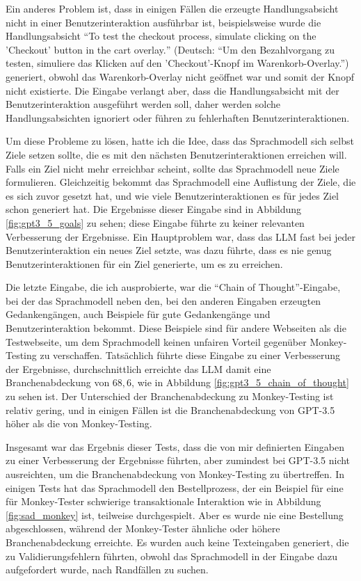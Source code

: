 Ein anderes Problem ist, dass in einigen Fällen die erzeugte Handlungsabsicht nicht in einer Benutzerinteraktion ausführbar ist, beispielsweise wurde die Handlungsabsicht \enquote{\foreignlanguage{english}{To test the checkout process, simulate clicking on the 'Checkout' button in the cart overlay.}} (Deutsch: \enquote{Um den Bezahlvorgang zu testen, simuliere das Klicken auf den 'Checkout'-Knopf im Warenkorb-Overlay.}) generiert, obwohl das Warenkorb-Overlay nicht geöffnet war und somit der Knopf nicht existierte.
Die Eingabe verlangt aber, dass die Handlungsabsicht mit der Benutzerinteraktion ausgeführt werden soll, daher werden solche Handlungsabsichten ignoriert oder führen zu fehlerhaften Benutzerinteraktionen.

Um diese Probleme zu lösen, hatte ich die Idee, dass das Sprachmodell sich selbst Ziele setzen sollte, die es mit den nächsten Benutzerinteraktionen erreichen will.
Falls ein Ziel nicht mehr erreichbar scheint, sollte das Sprachmodell neue Ziele formulieren.
Gleichzeitig bekommt das Sprachmodell eine Auflistung der Ziele, die es sich zuvor gesetzt hat, und wie viele Benutzerinteraktionen es für jedes Ziel schon generiert hat.
Die Ergebnisse dieser Eingabe sind in Abbildung \ref{fig:gpt3_5_goals} zu sehen; diese Eingabe führte zu keiner relevanten Verbesserung der Ergebnisse.
Ein Hauptproblem war, dass das LLM fast bei jeder Benutzerinteraktion ein neues Ziel setzte, was dazu führte, dass es nie genug Benutzerinteraktionen für ein Ziel generierte, um es zu erreichen.

Die letzte Eingabe, die ich ausprobierte, war die \enquote{Chain of Thought}-Eingabe, bei der das Sprachmodell neben den, bei den anderen Eingaben erzeugten Gedankengängen, auch Beispiele für gute Gedankengänge und Benutzerinteraktion bekommt.
Diese Beispiele sind für andere Webseiten als die Testwebseite, um dem Sprachmodell keinen unfairen Vorteil gegenüber Monkey-Testing zu verschaffen.
Tatsächlich führte diese Eingabe zu einer Verbesserung der Ergebnisse, durchschnittlich erreichte das LLM damit eine Branchenabdeckung von $68{,}6$, wie in Abbildung \ref{fig:gpt3_5_chain_of_thought} zu sehen ist.
Der Unterschied der Branchenabdeckung zu Monkey-Testing ist relativ gering, und in einigen Fällen ist die Branchenabdeckung von GPT-3.5 höher als die von Monkey-Testing.

Insgesamt war das Ergebnis dieser Tests, dass die von mir definierten Eingaben zu einer Verbesserung der Ergebnisse führten, aber zumindest bei GPT-3.5 nicht ausreichten, um die Branchenabdeckung von Monkey-Testing zu übertreffen.
In einigen Tests hat das Sprachmodell den Bestellprozess, der ein Beispiel für eine für Monkey-Tester schwierige transaktionale Interaktion wie in Abbildung \ref{fig:sad_monkey} ist, teilweise durchgespielt.
Aber es wurde nie eine Bestellung abgeschlossen, während der Monkey-Tester ähnliche oder höhere Branchenabdeckung erreichte.
Es wurden auch keine Texteingaben generiert, die zu Validierungsfehlern führten, obwohl das Sprachmodell in der Eingabe dazu aufgefordert wurde, nach Randfällen zu suchen.


